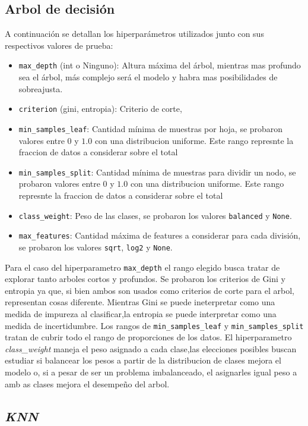 \documentclass[10pt,a4paper]{article}
\begin{document}
\subsection{Arbol de decisión}
A continuación se detallan los hiperparámetros utilizados junto con sus respectivos valores de prueba:

\begin{itemize}
    \item \texttt{max\_depth} (int o Ninguno): Altura máxima del árbol, mientras mas profundo sea el árbol, más complejo será el modelo y habra mas posibilidades de sobreajusta.
    \item \texttt{criterion} ({gini, entropia}): Criterio de corte,
    \item \texttt{min\_samples\_leaf}: Cantidad mínima de muestras por hoja, se probaron valores entre $0$ y $1.0$ con una distribucion uniforme. Este rango represnte la fraccion de datos a considerar sobre el total
    \item \texttt{min\_samples\_split}: Cantidad mínima de muestras para dividir un nodo, se probaron valores entre $0$ y $1.0$ con una distribucion uniforme. Este rango represnte la fraccion de datos a considerar sobre el total
    \item \texttt{class\_weight}: Peso de las clases, se probaron los valores \texttt{balanced} y \texttt{None}.
    \item \texttt{max\_features}: Cantidad máxima de features a considerar para cada división, se probaron los valores \texttt{sqrt}, \texttt{log2} y \texttt{None}.
\end{itemize}

Para el caso del hiperparametro \texttt{max\_depth} el rango elegido busca tratar de explorar tanto arboles cortos y profundos. Se probaron los criterios de Gini y entropia ya que, si bien ambos 
son usados como criterios de corte para el arbol, representan cosas diferente. Mientras Gini se puede ineterpretar como una medida de impureza al clasificar,la entropia se puede interpretar como una medida de incertidumbre.
Los rangos de \texttt{min\_samples\_leaf} y \texttt{min\_samples\_split} tratan de cubrir todo el rango de proporciones de los datos. El hiperparametro \textit{class\_weight} maneja el peso asignado a cada clase,las elecciones posibles buscan estudiar si balancear los pesos a partir de la distribucion de clases mejora el modelo o, si a pesar de ser un problema imbalanceado, el asignarles igual peso a amb
as clases mejora el desempeño del arbol.
\subsection{\textit{KNN}}
\end{document}
